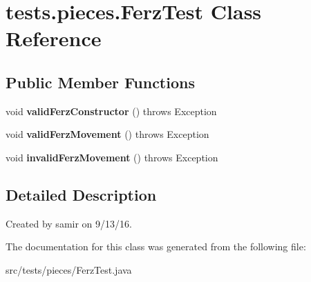 \hypertarget{classtests_1_1pieces_1_1_ferz_test}{}\section{tests.\+pieces.\+Ferz\+Test Class Reference}
\label{classtests_1_1pieces_1_1_ferz_test}
\subsection*{Public Member Functions}
\begin{DoxyCompactItemize}
\item 
\hypertarget{classtests_1_1pieces_1_1_ferz_test_a749f621df6526170fce1b73027f37e24}{}\label{classtests_1_1pieces_1_1_ferz_test_a749f621df6526170fce1b73027f37e24} 
void {\bfseries valid\+Ferz\+Constructor} ()  throws Exception 
\item 
\hypertarget{classtests_1_1pieces_1_1_ferz_test_abef0326a5f5a18b5a3222960db123796}{}\label{classtests_1_1pieces_1_1_ferz_test_abef0326a5f5a18b5a3222960db123796} 
void {\bfseries valid\+Ferz\+Movement} ()  throws Exception 
\item 
\hypertarget{classtests_1_1pieces_1_1_ferz_test_acb84f9a4456bcf2d2a37de394513dd66}{}\label{classtests_1_1pieces_1_1_ferz_test_acb84f9a4456bcf2d2a37de394513dd66} 
void {\bfseries invalid\+Ferz\+Movement} ()  throws Exception 
\end{DoxyCompactItemize}


\subsection{Detailed Description}
Created by samir on 9/13/16. 

The documentation for this class was generated from the following file\+:\begin{DoxyCompactItemize}
\item 
src/tests/pieces/Ferz\+Test.\+java\end{DoxyCompactItemize}
